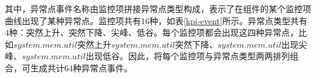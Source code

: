 其中，异常点事件名称由监控项拼接异常点类型构成，表示了在组件的某个监控项曲线出现了某种异常点。监控项共有16种，如表\ref{kpi-event}所示。异常点类型共有4种：突然上升、突然下降、尖峰、低谷。每个监控项都会出现这四种异常点，比如$system.mem.util$突然上升$system.mem.util$突然下降、$system.mem.util$出现尖峰、$system.mem.util$出现低谷。因此，将每个监控项与异常点类型两两排列组合，可生成共计64种异常点事件。
\newpage
